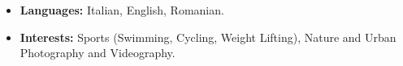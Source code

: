 
{
\vspace{1em}
\begin{itemize}
	\item \textbf{Languages:} Italian, English, Romanian.
	\item \textbf{Interests:} Sports (Swimming, Cycling, Weight Lifting), Nature and Urban Photography and Videography. 
\end{itemize}
}
